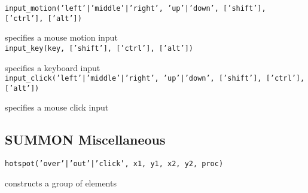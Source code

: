 {\tt input\_motion('left'|'middle'|'right', 'up'|'down', ['shift'], ['ctrl'], ['alt']) }

specifies a mouse motion input \\


{\tt input\_key(key, ['shift'], ['ctrl'], ['alt']) }

specifies a keyboard input \\


{\tt input\_click('left'|'middle'|'right', 'up'|'down', ['shift'], ['ctrl'], ['alt']) }

specifies a mouse click input \\


\subsection{ SUMMON Miscellaneous }

{\tt hotspot('over'|'out'|'click', x1, y1, x2, y2, proc) }

constructs a group of elements \\


